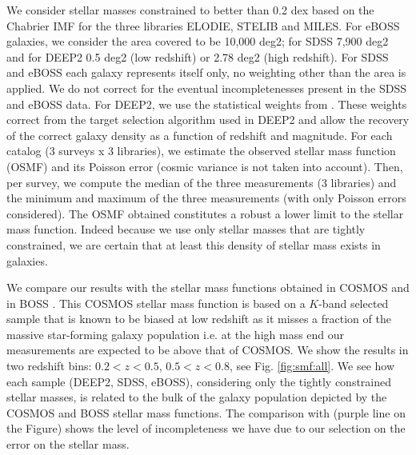 \documentclass[onecolumn]{aa}
\begin{document}
We consider stellar masses constrained to better than 0.2 dex based on the Chabrier IMF for the three libraries ELODIE, STELIB and MILES. 
For eBOSS galaxies, we consider the area covered to be 10,000 deg2; for SDSS 7,900 deg2 and for DEEP2 0.5 deg2 (low redshift) or 2.78 deg2 (high redshift).
For SDSS and eBOSS each galaxy represents itself only, no weighting other than the area is applied. 
We do not correct for the eventual incompletenesses present in the SDSS and eBOSS data. 
For DEEP2, we use the statistical weights from \citet{Comparat2016LFs}. These weights correct from the target selection algorithm used in DEEP2 and allow the recovery of the correct galaxy density as a function of redshift and magnitude. 
For each catalog (3 surveys x 3 libraries), we estimate the observed stellar mass function (OSMF) and its Poisson error (cosmic variance is not taken into account). 
Then, per survey, we compute the median of the three measurements (3 libraries) and the minimum and maximum of the three measurements (with only Poisson errors considered). 
The OSMF obtained constitutes a robust a lower limit to the stellar mass function. 
Indeed because we use only stellar masses that are tightly constrained, we are certain that at least this density of stellar mass exists in galaxies.

We compare our results with the stellar mass functions obtained in COSMOS \citet{Ilbert2013SMF} and in BOSS \citep{Maraston2013}. 
This COSMOS stellar mass function is based on a $K$-band selected sample that is known to be biased at low redshift as it misses a fraction of the massive star-forming galaxy population i.e. at the high mass end our measurements are expected to be above that of COSMOS. 
We show the results in two redshift bins: $0.2<z<0.5$, $0.5<z<0.8$, see Fig. \ref{fig:smf:all}. 
We see how each sample (DEEP2, SDSS, eBOSS), considering only the tightly constrained stellar masses, is related to the bulk of the galaxy population depicted by the COSMOS and BOSS stellar mass functions. 
The comparison with \citet{Maraston2013} (purple line on the Figure) shows the level of incompleteness we have due to our selection on the error on the stellar mass. 

\end{document}
